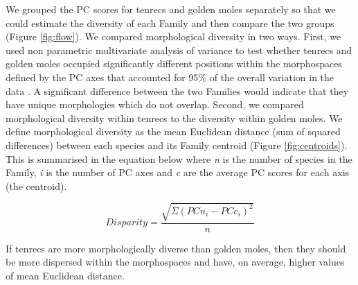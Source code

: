 \documentclass[12pt,a4paper]{article}
\begin{document}
	We grouped the PC scores for tenrecs and golden moles separately so that we could estimate the diversity of each Family and then compare the two groups (Figure \ref{fig:flow}). We compared morphological diversity in two ways. First, we used non parametric multivariate analysis of variance \citep[npMANOVA;][]{Anderson2001} to test whether tenrecs and golden moles occupied significantly different positions within the morphospaces defined by the PC axes that accounted for 95\% of the overall variation in the data \citep[e.g.][]{Serb2011, Ruta2013}. A significant difference between the two Families would indicate that they have unique morphologies which do not overlap. Second, we compared morphological diversity within tenrecs to the diversity within golden moles. We define morphological diversity as the mean Euclidean distance (sum of squared differences) between each species and its Family centroid (Figure \ref{fig:centroids}). This is summarised in the equation below where \textit{n} is the number of species in the Family, \textit{i} is the number of PC axes and \textit{c} are the average PC scores for each axis (the centroid). 
	
	\begin{equation}
	Disparity = \frac{\sqrt{\Sigma(PCn_{i}-PCc_{i})^2}}{n}
	\end{equation}


	If tenrecs are more morphologically diverse than golden moles, then they should be more dispersed within the morphospaces and have, on average, higher values of mean Euclidean distance. 	
\end{document}
